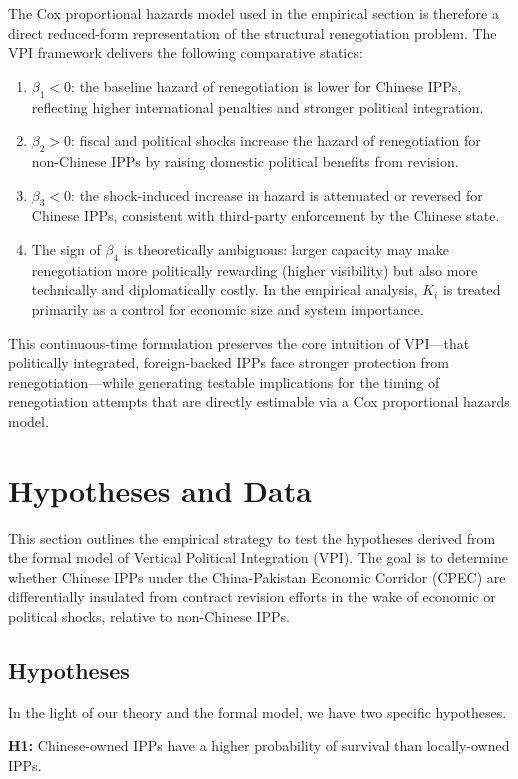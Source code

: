 \documentclass[12pt]{article}
\begin{document}
The Cox proportional hazards model used in the empirical section is therefore a direct reduced-form representation of the structural renegotiation problem. The VPI framework delivers the following comparative statics:
\begin{enumerate}
  \item $\beta_1 < 0$: the baseline hazard of renegotiation is lower for Chinese IPPs, reflecting higher international penalties and stronger political integration.
  \item $\beta_2 > 0$: fiscal and political shocks increase the hazard of renegotiation for non-Chinese IPPs by raising domestic political benefits from revision.
  \item $\beta_3 < 0$: the shock-induced increase in hazard is attenuated or reversed for Chinese IPPs, consistent with third-party enforcement by the Chinese state.
  \item The sign of $\beta_4$ is theoretically ambiguous: larger capacity may make renegotiation more politically rewarding (higher visibility) but also more technically and diplomatically costly. In the empirical analysis, $K_i$ is treated primarily as a control for economic size and system importance.
\end{enumerate}

This continuous-time formulation preserves the core intuition of VPI---that politically integrated, foreign-backed IPPs face stronger protection from renegotiation---while generating testable implications for the timing of renegotiation attempts that are directly estimable via a Cox proportional hazards model.


\section{Hypotheses and Data}
This section outlines the empirical strategy to test the hypotheses derived from the formal model of Vertical Political Integration (VPI). The goal is to determine whether Chinese IPPs under the China-Pakistan Economic Corridor (CPEC) are differentially insulated from contract revision efforts in the wake of economic or political shocks, relative to non-Chinese IPPs.

\subsection{Hypotheses}
In the light of our theory and the formal model, we have two specific hypotheses.

\textbf{H1:} Chinese-owned IPPs have a higher probability of survival than locally-owned IPPs.
\end{document}
